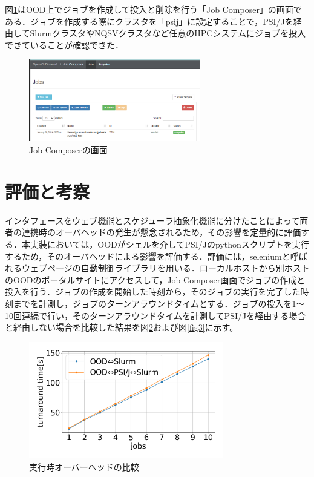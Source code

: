 \documentclass[a4paper,oneside,twocolumn,notitlepage,dvipdfmx]{jsarticle}
\begin{document}
図\ref{fig4}はOOD上でジョブを作成して投入と削除を行う「Job Composer」の画面である．ジョブを作成する際にクラスタを「psij」に設定することで，PSI/Jを経由してSlurmクラスタやNQSVクラスタなど任意のHPCシステムにジョブを投入できていることが確認できた．\par

\begin{figure}[tb]
  \centering
  \includegraphics[width=75mm]{./fig/jobcomposer.png}
  \caption{Job Composerの画面}
  \label{fig4}
\end{figure}

\vspace{3\baselineskip}
\section{評価と考察}
インタフェースをウェブ機能とスケジューラ抽象化機能に分けたことによって両者の連携時のオーバヘッドの発生が懸念されるため，その影響を定量的に評価する．本実装においては，OODがシェルを介してPSI/Jのpythonスクリプトを実行するため，そのオーバヘッドによる影響を評価する．評価には，seleniumと呼ばれるウェブページの自動制御ライブラリを用いる．ローカルホストから別ホストのOODのポータルサイトにアクセスして，Job Composer画面でジョブの作成と投入を行う．ジョブの作成を開始した時刻から，そのジョブの実行を完了した時刻までを計測し，ジョブのターンアラウンドタイムとする．ジョブの投入を1～10回連続で行い，そのターンアラウンドタイムを計測してPSI/Jを経由する場合と経由しない場合を比較した結果を図\ref{fig2}および図\ref{fig3}に示す。\par

\begin{figure}[tb]
  \centering
  \hspace{-11mm}
  \includegraphics[width=85mm]{./fig/ave_1-20.png}
  \vspace{-10pt}
  \caption{実行時オーバーヘッドの比較}
  \label{fig2}
\end{figure}
\end{document}

